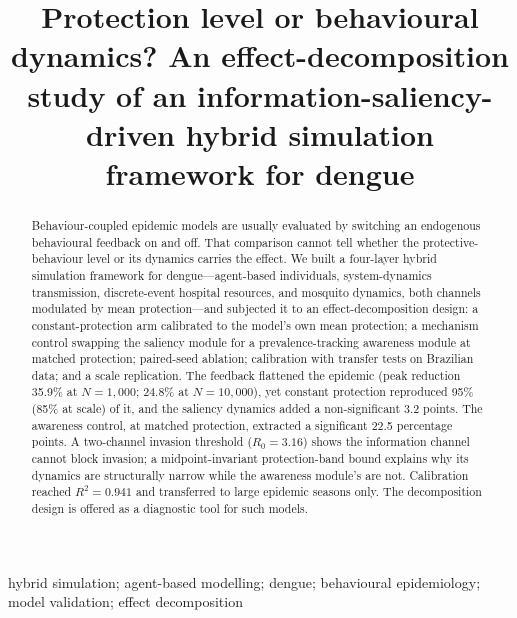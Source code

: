 \documentclass[]{interact}
\begin{document}

\title{Protection level or behavioural dynamics? An effect-decomposition study of an information-saliency-driven hybrid simulation framework for dengue}


\author{
}

\maketitle

\begin{abstract}
Behaviour-coupled epidemic models are usually evaluated by switching an endogenous behavioural feedback on and off. That comparison cannot tell whether the protective-behaviour level or its dynamics carries the effect. We built a four-layer hybrid simulation framework for dengue---agent-based individuals, system-dynamics transmission, discrete-event hospital resources, and mosquito dynamics, both channels modulated by mean protection---and subjected it to an effect-decomposition design: a constant-protection arm calibrated to the model's own mean protection; a mechanism control swapping the saliency module for a prevalence-tracking awareness module at matched protection; paired-seed ablation; calibration with transfer tests on Brazilian data; and a scale replication. The feedback flattened the epidemic (peak reduction 35.9\% at $N{=}1{,}000$; 24.8\% at $N{=}10{,}000$), yet constant protection reproduced 95\% (85\% at scale) of it, and the saliency dynamics added a non-significant 3.2 points. The awareness control, at matched protection, extracted a significant 22.5 percentage points. A two-channel invasion threshold ($R_0{=}3.16$) shows the information channel cannot block invasion; a midpoint-invariant protection-band bound explains why its dynamics are structurally narrow while the awareness module's are not. Calibration reached $R^2=0.941$ and transferred to large epidemic seasons only. The decomposition design is offered as a diagnostic tool for such models.
\end{abstract}

\begin{keywords}
hybrid simulation; agent-based modelling; dengue; behavioural epidemiology; model validation; effect decomposition
\end{keywords}
\end{document}
